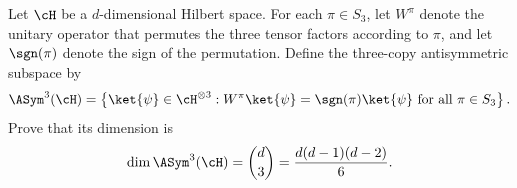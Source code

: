Let $\cH$ be a $d$-dimensional Hilbert space. For each $\pi\in S_3$, let $W^\pi$ denote the unitary operator that permutes the three tensor factors according to $\pi$, and let $\sgn(\pi)$ denote the sign of the permutation. Define the three-copy antisymmetric subspace by
$$
\ASym^3(\cH)
=
\left\{
\ket{\psi}\in\cH^{\otimes3}:
W^\pi\ket{\psi}=\sgn(\pi)\ket{\psi}\text{ for all }\pi\in S_3
\right\}.
$$
Prove that its dimension is
$$
\dim\ASym^3(\cH)
=
\binom{d}{3}
=
\frac{d(d-1)(d-2)}{6}.
$$
